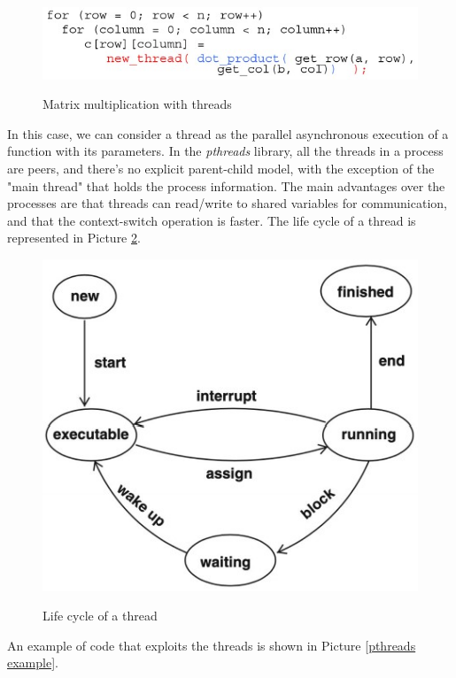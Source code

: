 \begin{figure}[h!]
		\centering
		\includegraphics[scale = 1.5]{img/mm_threads.jpg}
        \label{mm_threads}
        \caption{Matrix multiplication with threads}
\end{figure}

In this case, we can consider a thread as the parallel asynchronous execution of a function with its parameters. In the \textit{pthreads} library, all the threads in a process are peers, and there's no explicit parent-child model, with the exception of the "main thread" that holds the process information. The main advantages over the processes are that threads can read/write to shared variables for communication, and that the context-switch operation is faster. The life cycle of a thread is represented in Picture \ref{threads}.

\begin{figure}[h!]
		\centering
		\includegraphics[scale = 1.5]{img/threads.jpg}
        \label{threads}
        \caption{Life cycle of a thread}
\end{figure}

An example of code that exploits the threads is shown in Picture \ref{pthreads example}.

